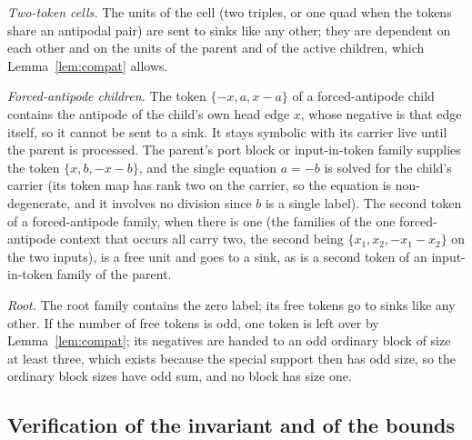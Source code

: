\documentclass[11pt,a4paper]{article}
\theoremstyle{plain}
\theoremstyle{definition}
\theoremstyle{remark}
\begin{document}
\emph{Two-token cells.}  The units of the cell (two triples, or one quad when
the tokens share an antipodal pair) are sent to sinks like any other; they are
dependent on each other and on the units of the parent and of the active
children, which Lemma~\ref{lem:compat} allows.

\emph{Forced-antipode children.}  The token $\{-x,a,x-a\}$ of a
forced-antipode child contains the antipode of the child's own head edge $x$,
whose negative is that edge itself, so it cannot be sent to a sink.  It stays
symbolic with its carrier live until the parent is processed.  The parent's
port block or input-in-token family supplies the token $\{x,b,-x-b\}$, and the
single equation $a=-b$ is solved for the child's carrier (its token map has
rank two on the carrier, so the equation is non-degenerate, and it involves no
division since $b$ is a single label).  The second token of a forced-antipode
family, when there is one (the families of the one forced-antipode context
that occurs all carry two, the second being $\{x_1,x_2,-x_1-x_2\}$ on the two
inputs), is a free unit and goes to a sink, as is a second token of an
input-in-token family of the parent.

\emph{Root.}  The root family contains the zero label; its free tokens go to
sinks like any other.  If the number of free tokens is odd, one token is left
over by Lemma~\ref{lem:compat}; its negatives are handed to an odd ordinary
block of size at least three, which exists because the special support then
has odd size, so the ordinary block sizes have odd sum, and no block has size
one.

\subsection*{Verification of the invariant and of the bounds}
\end{document}
